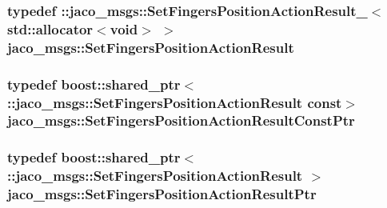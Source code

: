 \subsubsection[{\texorpdfstring{Set\+Fingers\+Position\+Action\+Result}{SetFingersPositionActionResult}}]{\setlength{\rightskip}{0pt plus 5cm}typedef \+::{\bf jaco\+\_\+msgs\+::\+Set\+Fingers\+Position\+Action\+Result\+\_\+}$<$std\+::allocator$<$void$>$ $>$ {\bf jaco\+\_\+msgs\+::\+Set\+Fingers\+Position\+Action\+Result}}\hypertarget{namespacejaco__msgs_abe0caa1fc40ecf2de26ec686e3c4a0fb}{}\label{namespacejaco__msgs_abe0caa1fc40ecf2de26ec686e3c4a0fb}
\subsubsection[{\texorpdfstring{Set\+Fingers\+Position\+Action\+Result\+Const\+Ptr}{SetFingersPositionActionResultConstPtr}}]{\setlength{\rightskip}{0pt plus 5cm}typedef boost\+::shared\+\_\+ptr$<$ \+::{\bf jaco\+\_\+msgs\+::\+Set\+Fingers\+Position\+Action\+Result} const$>$ {\bf jaco\+\_\+msgs\+::\+Set\+Fingers\+Position\+Action\+Result\+Const\+Ptr}}\hypertarget{namespacejaco__msgs_aee01d75d20086911a84dd80ddf97f132}{}\label{namespacejaco__msgs_aee01d75d20086911a84dd80ddf97f132}
\subsubsection[{\texorpdfstring{Set\+Fingers\+Position\+Action\+Result\+Ptr}{SetFingersPositionActionResultPtr}}]{\setlength{\rightskip}{0pt plus 5cm}typedef boost\+::shared\+\_\+ptr$<$ \+::{\bf jaco\+\_\+msgs\+::\+Set\+Fingers\+Position\+Action\+Result} $>$ {\bf jaco\+\_\+msgs\+::\+Set\+Fingers\+Position\+Action\+Result\+Ptr}}\hypertarget{namespacejaco__msgs_a86bbaee297d8ebb495034ab11eb539b4}{}\label{namespacejaco__msgs_a86bbaee297d8ebb495034ab11eb539b4}

